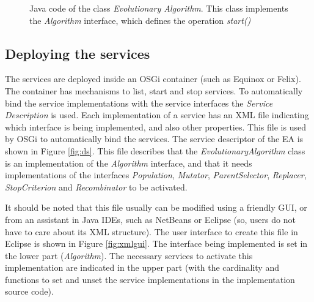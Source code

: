 \begin{figure}
\usebox{\mintedbox}
\caption{Java code of the class {\em Evolutionary Algorithm}. This class implements the {\em Algorithm} interface, which defines the operation {\em start()} } 
\label{fig:javaevo} 
\end{figure}



\subsection{Deploying the services}

The services are deployed inside an OSGi container (such as Equinox or Felix). The container has mechanisms to list, start and stop services. To automatically bind the service implementations with the service interfaces                                
 the {\em Service Description} is used. %
Each implementation of a service has an XML file indicating which interface is being implemented, and also other properties. This file is used by OSGi to automatically bind the services. The service descriptor of the EA is shown in Figure \ref{fig:ds}. This file describes that the {\em EvolutionaryAlgorithm} class is an implementation of the {\em Algorithm} interface, and that it needs implementations of the interfaces {\em Population}, {\em Mutator}, {\em ParentSelector}, {\em Replacer}, {\em StopCriterion} and {\em Recombinator} to be activated.

It should be noted that this file usually can be modified using a friendly GUI, or from an assistant in Java IDEs, such as NetBeans or Eclipse (so, users do not have to care about its XML structure). The user interface to create this file in Eclipse is shown in Figure \ref{fig:xmlgui}. The interface being implemented is set in the lower part ({\em Algorithm}). The necessary services to activate this implementation are indicated in the upper part (with the cardinality and functions to set and unset the service implementations in the implementation source code).

